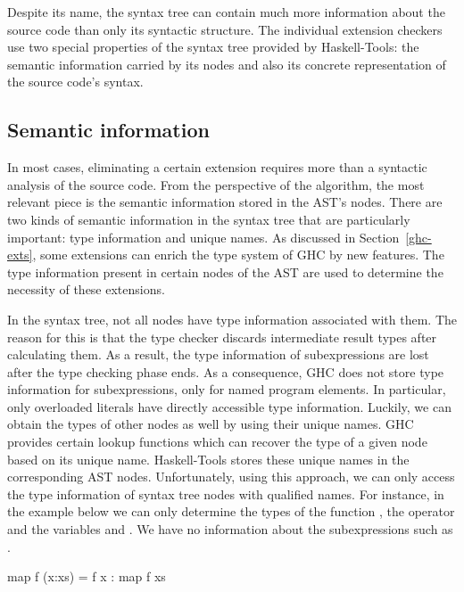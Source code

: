 \documentclass[main.tex]{subfiles}
\begin{document}
	Despite its name, the syntax tree can contain much more information about the source code than only its syntactic structure. The individual extension checkers use two special properties of the syntax tree provided by Haskell-Tools: the semantic information carried by its nodes and also its concrete representation of the source code's syntax.
	
	\subsection{Semantic information}
	
	
	In most cases, eliminating a certain extension requires more than a syntactic analysis of the source code. From the perspective of the algorithm, the most relevant piece is the semantic information stored in the AST's nodes. There are two kinds of semantic information in the syntax tree that are particularly important: type information and unique names. As discussed in Section~\ref{ghc-exts}, some extensions can enrich the type system of GHC by new features. The type information present in certain nodes of the AST are used to determine the necessity of these extensions.
	
	In the syntax tree, not all nodes have type information associated with them. The reason for this is that the type checker discards intermediate result types after calculating them. As a result, the type information of subexpressions are lost after the type checking phase ends. As a consequence, GHC does not store type information for subexpressions, only for named program elements. In particular, only overloaded literals have directly accessible type information. Luckily, we can obtain the types of other nodes as well by using their unique names. GHC provides certain lookup functions which can recover the type of a given node based on its unique name. Haskell-Tools stores these unique names in the corresponding AST nodes. Unfortunately, using this approach, we can only access the type information of syntax tree nodes with qualified names. For instance, in the example below we can only determine the types of the function , the operator \ilcode{(:)} and the variables  and . We have no information about the subexpressions such as .
	
	\begin{oneLineHaskell}
		map f (x:xs) = f x : map f xs
	\end{oneLineHaskell}
	
\end{document}
